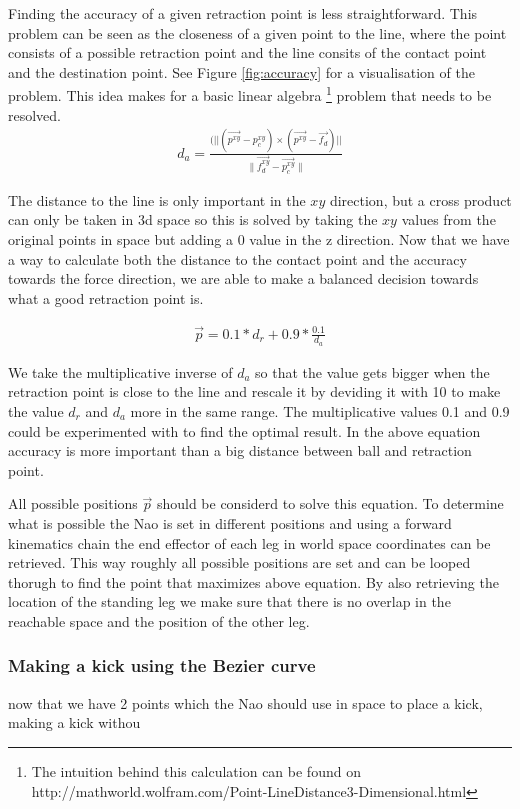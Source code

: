 \documentclass[a4paper]{article}
\begin{document}
Finding the accuracy of a given retraction point is less straightforward. This
problem can be seen as the closeness of a given point to the line, where the
point consists of a possible retraction point and the line consits of the
contact point and the destination point. See Figure \ref{fig:accuracy} for a
visualisation of the problem. This idea makes for a basic linear algebra
\footnote{The intuition behind this calculation can be found on http://mathworld.wolfram.com/Point-LineDistance3-Dimensional.html }
problem that needs to be resolved.
\begin{align*}
    d_a = \frac{(||(\vec{p^{xy}} - p_c^{xy}) \times (\vec{p^{xy}} -
    \vec{f_d})||}{\|\vec{f_d^{xy}}- \vec{p_c^{xy}}\|}
\end{align*}

The distance to the line is only important in the $xy$ direction, but a cross
product can only be taken in 3d space so this is solved by taking the $xy$
values from the original points in space but adding a 0 value in the z
direction.
Now that we have a way to calculate both the distance to the contact point and
the accuracy towards the force direction, we are able to make a balanced
decision towards what a good retraction point is.

\begin{align*}
    \vec{p} = 0.1 * d_r + 0.9 * \frac{0.1}{d_a}
\end{align*}

We take the multiplicative inverse of $d_a$ so that the value gets bigger when the
retraction point is close to the line and rescale it by deviding it with 10 to
make the value $d_r$ and $d_a$ more in the same range. The multiplicative values
0.1 and 0.9 could be experimented with to find the optimal result. In the above
equation accuracy is more important than a big distance between ball and
retraction point.

All possible positions $\vec{p}$ should be considerd to solve this equation. To
determine what is possible the Nao is set in different positions and using a
forward kinematics chain the end effector of each leg in world space coordinates
can be retrieved. This way roughly all possible positions are set and can be
looped thorugh to find the point that maximizes above equation. By also
retrieving the location of the standing leg we make sure that there is
no overlap in the reachable space and the position of the other leg.

\subsubsection{Making a kick using the Bezier curve}
now that we have 2 points which the Nao should use in space to place a kick,
making a kick withou
\end{document}
